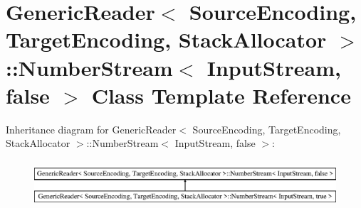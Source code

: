 \hypertarget{class_generic_reader_1_1_number_stream_3_01_input_stream_00_01false_01_4}{}\section{Generic\+Reader$<$ Source\+Encoding, Target\+Encoding, Stack\+Allocator $>$\+:\+:Number\+Stream$<$ Input\+Stream, false $>$ Class Template Reference}
\label{class_generic_reader_1_1_number_stream_3_01_input_stream_00_01false_01_4}
Inheritance diagram for Generic\+Reader$<$ Source\+Encoding, Target\+Encoding, Stack\+Allocator $>$\+:\+:Number\+Stream$<$ Input\+Stream, false $>$\+:\begin{figure}[H]
\begin{center}
\leavevmode
\includegraphics[height=1.783440cm]{class_generic_reader_1_1_number_stream_3_01_input_stream_00_01false_01_4}
\end{center}
\end{figure}
